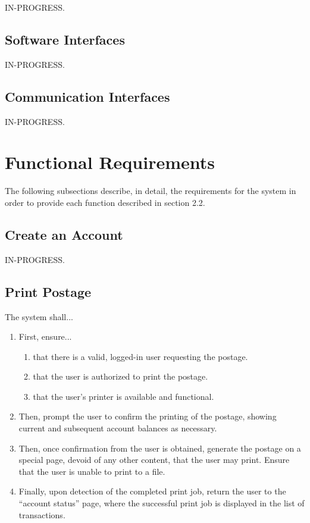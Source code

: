 \documentclass{scrreprt}
\begin{document}
IN-PROGRESS.

\subsection{Software Interfaces}

IN-PROGRESS.

\subsection{Communication Interfaces}

IN-PROGRESS.

\section{Functional Requirements}

The following subsections describe, in detail, the requirements for 
the system in order to provide each function described in section 
2.2.

\subsection{Create an Account}

IN-PROGRESS.

\subsection{Print Postage}

The system shall...

\begin{enumerate}
\item First, ensure...
\begin{enumerate}
\item that there is a valid, logged-in user requesting the postage.
\item that the user is authorized to print the postage.
\item that the user's printer is available and functional.
\end{enumerate}
\item Then, prompt the user to confirm the printing of the postage, showing
current and subsequent account balances as necessary.
\item Then, once confirmation from the user is obtained, generate the postage
on a special page, devoid of any other content, that the user may print. Ensure
that the user is unable to print to a file.
\item Finally, upon detection of the completed print job, return the user to
the ``account status'' page, where the successful print job is displayed in the
list of transactions.
\end{enumerate}
\end{document}
